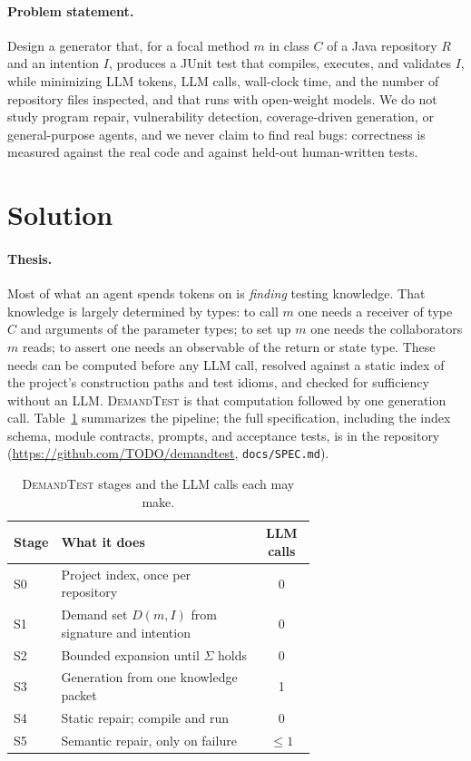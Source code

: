 \documentclass[sigconf,nonacm]{acmart}
\newcommand{\tool}{\textsc{DemandTest}\xspace}
\newcommand{\suff}{\ensuremath{\Sigma}\xspace}
\begin{document}
\paragraph{Problem statement.}
Design a generator that, for a focal method $m$ in class $C$ of a Java repository $R$ and an intention $I$, produces a JUnit test that compiles, executes, and validates $I$, while minimizing LLM tokens, LLM calls, wall-clock time, and the number of repository files inspected, and that runs with open-weight models. We do not study program repair, vulnerability detection, coverage-driven generation, or general-purpose agents, and we never claim to find real bugs: correctness is measured against the real code and against held-out human-written tests.

\section{Solution}
\label{sec:solution}

\paragraph{Thesis.}
Most of what an agent spends tokens on is \emph{finding} testing knowledge. That knowledge is largely determined by types: to call $m$ one needs a receiver of type $C$ and arguments of the parameter types; to set up $m$ one needs the collaborators $m$ reads; to assert one needs an observable of the return or state type. These needs can be computed before any LLM call, resolved against a static index of the project's construction paths and test idioms, and checked for sufficiency without an LLM. \tool is that computation followed by one generation call. Table~\ref{tab:stages} summarizes the pipeline; the full specification, including the index schema, module contracts, prompts, and acceptance tests, is in the repository (\url{https://github.com/TODO/demandtest}, \texttt{docs/SPEC.md}).

\begin{table}[t]
  \caption{\tool stages and the LLM calls each may make.}
  \label{tab:stages}
  \small
  \begin{tabular}{@{}lp{0.66\linewidth}c@{}}
    \toprule
    Stage & What it does & LLM calls \\
    \midrule
    S0 & Project index, once per repository & 0 \\
    S1 & Demand set $D(m,I)$ from signature and intention & 0 \\
    S2 & Bounded expansion until \suff holds & 0 \\
    S3 & Generation from one knowledge packet & 1 \\
    S4 & Static repair; compile and run & 0 \\
    S5 & Semantic repair, only on failure & $\le 1$ \\
    \bottomrule
  \end{tabular}
\end{table}
\end{document}
